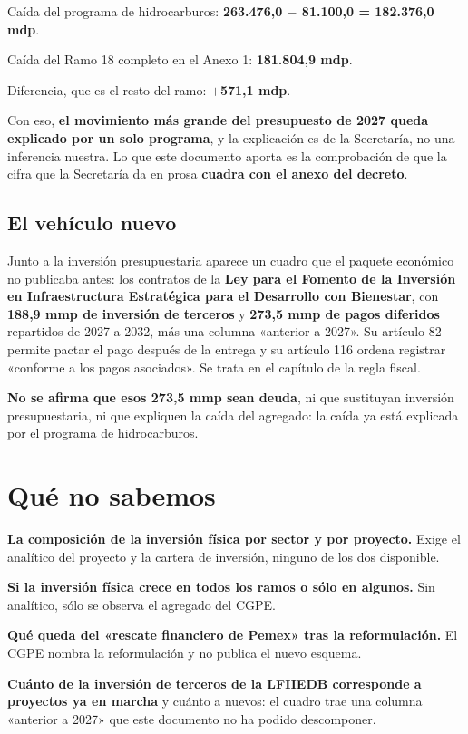 \begin{list}{}{\setlength{\leftmargin}{1.4em}\setlength{\itemsep}{2pt}}
\item[$\bullet$] Caída del programa de hidrocarburos: \textbf{263.476,0 $-$ 81.100,0 =
182.376,0 mdp}.
\item[$\bullet$] Caída del Ramo 18 completo en el Anexo 1: \textbf{181.804,9 mdp}.
\item[$\bullet$] Diferencia, que es el resto del ramo: \textbf{$+$571,1 mdp}.
\end{list}

Con eso, \textbf{el movimiento más grande del presupuesto de 2027 queda explicado por un
solo programa}, y la explicación es de la Secretaría, no una inferencia nuestra. Lo que
este documento aporta es la comprobación de que la cifra que la Secretaría da en prosa
\textbf{cuadra con el anexo del decreto}.

\subsection*{El vehículo nuevo}

Junto a la inversión presupuestaria aparece un cuadro que el paquete económico no publicaba
antes: los contratos de la \textbf{Ley para el Fomento de la Inversión en Infraestructura
Estratégica para el Desarrollo con Bienestar}, con \textbf{188,9 mmp de inversión de
terceros} y \textbf{273,5 mmp de pagos diferidos} repartidos de 2027 a 2032, más una columna
«anterior a 2027». Su artículo 82 permite pactar el pago después de la entrega y su artículo
116 ordena registrar «conforme a los pagos asociados». Se trata en el capítulo de la regla
fiscal.

\textbf{No se afirma que esos 273,5 mmp sean deuda}, ni que sustituyan inversión
presupuestaria, ni que expliquen la caída del agregado: la caída ya está explicada por el
programa de hidrocarburos.

\section{Qué no sabemos}

\begin{list}{}{\setlength{\leftmargin}{1.4em}\setlength{\itemsep}{2pt}}
\item[$\bullet$] \textbf{La composición de la inversión física por sector y por proyecto.}
Exige el analítico del proyecto y la cartera de inversión, ninguno de los dos disponible.
\item[$\bullet$] \textbf{Si la inversión física crece en todos los ramos o sólo en algunos.}
Sin analítico, sólo se observa el agregado del CGPE.
\item[$\bullet$] \textbf{Qué queda del «rescate financiero de Pemex» tras la
reformulación.} El CGPE nombra la reformulación y no publica el nuevo esquema.
\item[$\bullet$] \textbf{Cuánto de la inversión de terceros de la LFIIEDB corresponde a
proyectos ya en marcha} y cuánto a nuevos: el cuadro trae una columna «anterior a 2027» que
este documento no ha podido descomponer.
\end{list}

